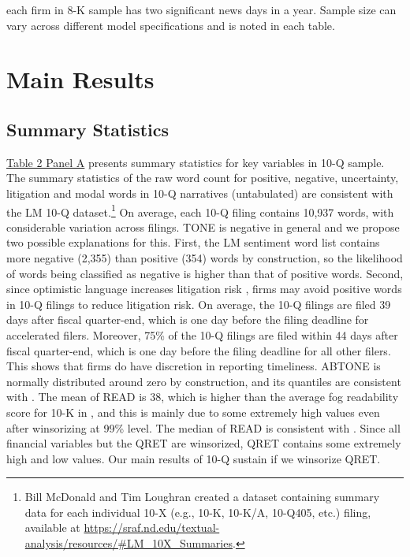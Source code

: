 \documentclass[a4paper]{article}
\begin{document}
\begin{spacing}{2}
each firm in 8-K sample has two significant news days in a year. Sample size can vary across different model specifications and is noted in each table. 

\section{Main Results}
\subsection{Summary Statistics}
\hyperref[T2PA]{Table 2 Panel A} presents summary statistics for key variables in 10-Q sample. The summary statistics of the raw word count for positive, negative, uncertainty, litigation and modal words in 10-Q narratives (untabulated) are consistent with the LM 10-Q dataset.\footnote{Bill McDonald and Tim Loughran created a dataset containing summary data for each individual 10-X (e.g., 10-K, 10-K/A, 10-Q405, etc.) filing, available at \url{https://sraf.nd.edu/textual-analysis/resources/\#LM_10X_Summaries}.} On average, each 10-Q filing contains 10,937 words, with considerable variation across filings. TONE is negative in general and we propose two possible explanations for this. First, the LM sentiment word list contains more negative (2,355) than positive (354) words by construction, so the likelihood of words being classified as negative is higher than that of positive words. Second, since optimistic language increases litigation risk \cite{rogersDisclosureToneShareholder2011, cazierWhenAreFirms2020}, firms may avoid positive words in 10-Q filings to reduce litigation risk. On average, the 10-Q filings are filed 39 days after fiscal quarter-end, which is one day before the filing deadline for accelerated filers. Moreover, 75\% of the 10-Q filings are filed within 44 days after fiscal quarter-end, which is one day before the filing deadline for all other filers. This shows that firms do have discretion in reporting timeliness. ABTONE is normally distributed around zero by construction, and its quantiles are consistent with . The mean of READ is 38, which is higher than the average fog readability score for 10-K in , and this is mainly due to some extremely high values even after winsorizing at 99\% level. The median of READ is consistent with . Since all financial variables but the QRET are winsorized, QRET contains some extremely high and low values. Our main results of 10-Q sustain if we winsorize QRET.


\end{spacing}
\end{document}
